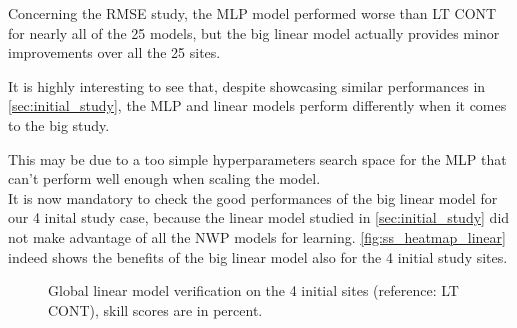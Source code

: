 Concerning the RMSE study, the MLP model performed worse than LT CONT for nearly all of the 25 models, but the big linear model actually provides minor improvements over all the 25 sites.

It is highly interesting to see that, despite showcasing similar performances in \autoref{sec:initial_study}, the MLP and linear models perform differently when it comes to the big study.

This may be due to a too simple hyperparameters search space for the MLP that can't perform well enough when scaling the model.\\

It is now mandatory to check the good performances of the big linear model for our 4 inital study case, because the linear model studied in \autoref{sec:initial_study} did not make advantage of all the NWP models for learning.
\autoref{fig:ss_heatmap_linear} indeed shows the benefits of the big linear model also for the 4 initial study sites.

\begin{figure}[htb!]
    \centering
    
\caption{Global linear model verification on the 4 initial sites (reference: LT CONT), skill scores are in percent.}
\label{fig:ss_heatmap_linear}
\end{figure}